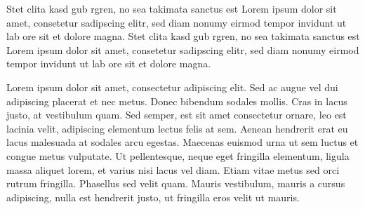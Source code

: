 Stet clita kasd gub rgren, no sea takimata sanctus est Lorem ipsum dolor sit amet, consetetur sadipscing elitr, sed diam nonumy eirmod tempor invidunt ut lab ore sit et dolore magna. Stet clita kasd gub rgren, no sea takimata sanctus est Lorem ipsum dolor sit amet, consetetur sadipscing elitr, sed diam nonumy eirmod tempor invidunt ut lab ore sit et dolore magna. 

Lorem ipsum dolor sit amet, consectetur adipiscing elit. Sed ac augue vel dui  adipiscing placerat et nec metus. Donec bibendum sodales mollis. Cras in lacus  justo, at vestibulum quam. Sed semper, est sit amet consectetur ornare, leo est  lacinia velit, adipiscing elementum lectus felis at sem. Aenean hendrerit erat eu  lacus malesuada at sodales arcu egestas. Maecenas euismod urna ut sem luctus et  congue metus vulputate. Ut pellentesque, neque eget fringilla elementum, ligula  massa aliquet lorem, et varius nisi lacus vel diam. Etiam vitae metus sed orci  rutrum fringilla. Phasellus sed velit quam. Mauris vestibulum, mauris a cursus  adipiscing, nulla est hendrerit justo, ut fringilla eros velit ut mauris.